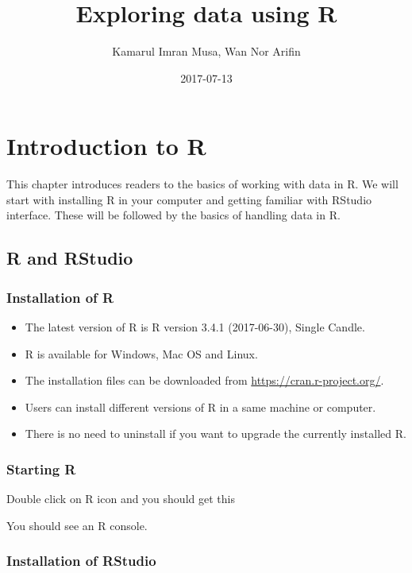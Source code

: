 \documentclass[]{book}
\title{Exploring data using R}
\author{Kamarul Imran Musa, Wan Nor Arifin}
\date{2017-07-13}
\providecommand{\tightlist}{%
  \setlength{\itemsep}{0pt}\setlength{\parskip}{0pt}}
\theoremstyle{definition}
\theoremstyle{definition}
\theoremstyle{remark}
\begin{document}
\maketitle

{
\setcounter{tocdepth}{1}
\tableofcontents
}
\chapter{Introduction to R}\label{introduction-to-r}

This chapter introduces readers to the basics of working with data in R.
We will start with installing R in your computer and getting familiar
with RStudio interface. These will be followed by the basics of handling
data in R.

\section{R and RStudio}\label{r-and-rstudio}

\subsection{Installation of R}\label{installation-of-r}

\begin{itemize}
\tightlist
\item
  The latest version of R is R version 3.4.1 (2017-06-30), Single
  Candle.
\item
  R is available for Windows, Mac OS and Linux.
\item
  The installation files can be downloaded from
  \url{https://cran.r-project.org/}.
\item
  Users can install different versions of R in a same machine or
  computer.
\item
  There is no need to uninstall if you want to upgrade the currently
  installed R.
\end{itemize}

\subsection{Starting R}\label{starting-r}

Double click on R icon and you should get this

You should see an R console.

\subsection{Installation of RStudio}\label{installation-of-rstudio}
\end{document}

